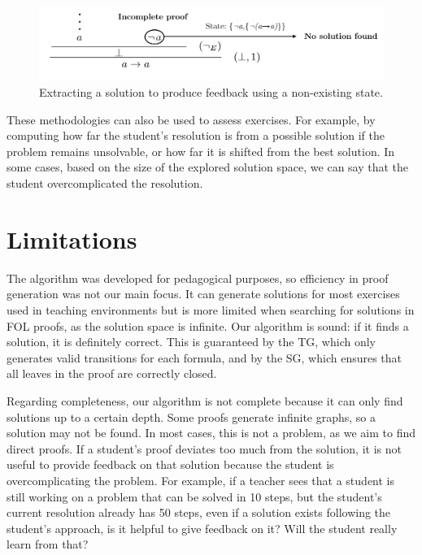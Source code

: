 \documentclass[runningheads]{llncs}
\begin{document}
\begin{figure}
    \centering
    \includegraphics[width=1\linewidth]{resources/trim-neg-feed.jpg}
    \caption{Extracting a solution to produce feedback using a non-existing state.}
    \label{fig:extract-solution2}
\end{figure}

These methodologies can also be used to assess exercises. For example, by computing how far the student’s resolution is from a possible solution if the problem remains unsolvable, or how far it is shifted from the best solution. In some cases, based on the size of the explored solution space, we can say that the student overcomplicated the resolution.

\section{Limitations}
The algorithm was developed for pedagogical purposes, so efficiency in proof generation was not our main focus. It can generate solutions for most exercises used in teaching environments but is more limited when searching for solutions in FOL proofs, as the solution space is infinite. Our algorithm is sound: if it finds a solution, it is definitely correct. This is guaranteed by the TG, which only generates valid transitions for each formula, and by the SG, which ensures that all leaves in the proof are correctly closed.

Regarding completeness, our algorithm is not complete because it can only find solutions up to a certain depth. Some proofs generate infinite graphs, so a solution may not be found. In most cases, this is not a problem, as we aim to find direct proofs. If a student’s proof deviates too much from the solution, it is not useful to provide feedback on that solution because the student is overcomplicating the problem. For example, if a teacher sees that a student is still working on a problem that can be solved in 10 steps, but the student’s current resolution already has 50 steps, even if a solution exists following the student’s approach, is it helpful to give feedback on it? Will the student really learn from that? 
\end{document}
